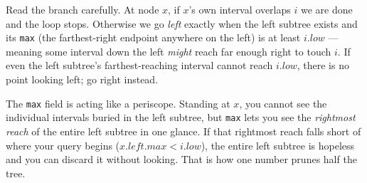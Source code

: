 Read the branch carefully. At node $x$, if $x$'s own interval overlaps $i$ we are
done and the loop stops. Otherwise we go \emph{left} exactly when the left
subtree exists and its \texttt{max} (the farthest-right endpoint anywhere on the
left) is at least $i.\mathit{low}$ --- meaning some interval down the left
\emph{might} reach far enough right to touch $i$. If even the left subtree's
farthest-reaching interval cannot reach $i.\mathit{low}$, there is no point
looking left; go right instead.

\begin{intuitionbox}
The \texttt{max} field is acting like a periscope. Standing at $x$, you cannot
see the individual intervals buried in the left subtree, but \texttt{max} lets
you see the \emph{rightmost reach} of the entire left subtree in one glance. If
that rightmost reach falls short of where your query begins
($x.\mathit{left}.\mathit{max} < i.\mathit{low}$), the entire left subtree is
hopeless and you can discard it without looking. That is how one number prunes
half the tree.
\end{intuitionbox}

